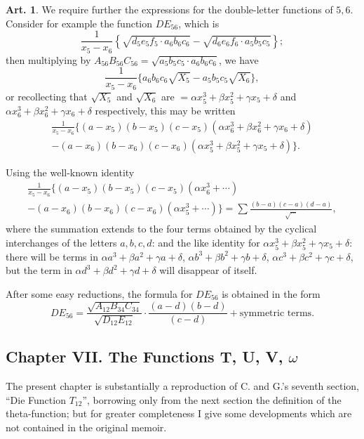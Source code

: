 \documentclass[11pt,a4paper]{article}
\theoremstyle{definition}
\newtheorem{art}{Art.}[section]
\begin{document}
\begin{art}
We require further the expressions for the double-letter functions of $5,6$. Consider for example the function $DE_{56}$, which is
\[
\frac{1}{x_5 - x_6}\left\{\sqrt{d_5 e_5 f_5 \cdot a_6 b_6 c_6} - \sqrt{d_6 e_6 f_6 \cdot a_5 b_5 c_5}\right\};
\]
then multiplying by $A_{56} B_{56} C_{56} = \sqrt{a_5 b_5 c_5 \cdot a_6 b_6 c_6}$, we have
\[
\frac{1}{x_5 - x_6}\{a_6 b_6 c_6 \sqrt{X_5} - a_5 b_5 c_5 \sqrt{X_6}\},
\]
or recollecting that $\sqrt{X_5}$ and $\sqrt{X_6}$ are $= \alpha x_5^3 + \beta x_5^2 + \gamma x_5 + \delta$ and $\alpha x_6^3 + \beta x_6^2 + \gamma x_6 + \delta$ respectively, this may be written
\begin{multline*}
\frac{1}{x_5 - x_6}\bigl\{(a-x_5)(b-x_5)(c-x_5)(\alpha x_6^3 + \beta x_6^2 + \gamma x_6 + \delta) \\
- (a-x_6)(b-x_6)(c-x_6)(\alpha x_5^3 + \beta x_5^2 + \gamma x_5 + \delta)\bigr\}.
\end{multline*}

Using the well-known identity
\begin{multline*}
\frac{1}{x_5 - x_6}\bigl\{(a-x_5)(b-x_5)(c-x_5)(\alpha x_6^3 + \cdots) \\
- (a-x_6)(b-x_6)(c-x_6)(\alpha x_5^3 + \cdots)\bigr\} = \sum \frac{(b-a)(c-a)(d-a)}{\sqrt{\cdots}},
\end{multline*}
where the summation extends to the four terms obtained by the cyclical interchanges of the letters $a,b,c,d$: and the like identity for $\alpha x_5^3 + \beta x_5^2 + \gamma x_5 + \delta$: there will be terms in $\alpha a^3 + \beta a^2 + \gamma a + \delta$, $\alpha b^3 + \beta b^2 + \gamma b + \delta$, $\alpha c^3 + \beta c^2 + \gamma c + \delta$, but the term in $\alpha d^3 + \beta d^2 + \gamma d + \delta$ will disappear of itself.

After some easy reductions, the formula for $DE_{56}$ is obtained in the form
\[
DE_{56} = \frac{\sqrt{A_{12} B_{34} C_{34}}}{\sqrt{D_{12} E_{12}}} \cdot \frac{(a-d)(b-d)}{(c-d)} + \text{symmetric terms}.
\]
\end{art}

\newpage
\subsection*{Chapter VII. The Functions T, U, V, $\omega$}

The present chapter is substantially a reproduction of C. and G.'s seventh section, ``Die Function $T_{12}$'', borrowing only from the next section the definition of the theta-function; but for greater completeness I give some developments which are not contained in the original memoir.
\end{document}
